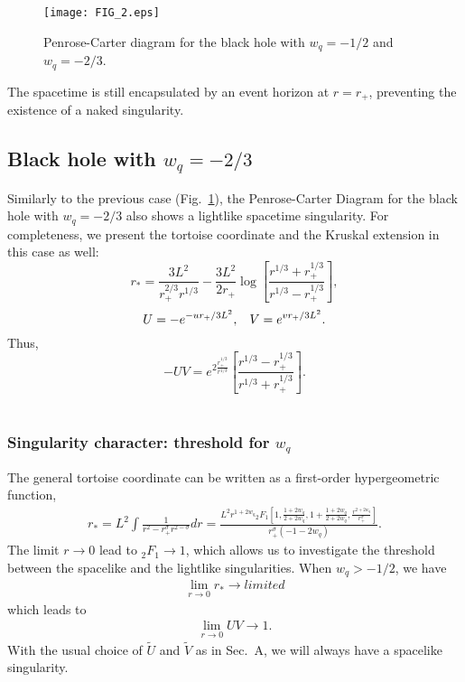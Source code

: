\documentclass[preprint]{revtex4-1}
\def\be{\begin{eqnarray}}
\def\ee{\end{eqnarray}}
\begin{document}
\begin{figure}[htp!]
\begin{center}
\texttt{[image: FIG\_2.eps]}
\end{center}
\caption{Penrose-Carter diagram for the black hole with $w_{q}=-1/2$ and $w_{q}=-2/3$.} \label{penrose_light}
\end{figure}

The spacetime is still encapsulated by an event horizon at $r=r_+$, preventing the existence of a naked singularity.

\subsection{Black hole with $w_{q}=-2/3$}

Similarly to the previous case (Fig.~\ref{penrose_light}), the Penrose-Carter Diagram for the black hole with $w_{q}=-2/3$ also shows a lightlike spacetime singularity. For completeness, we present the tortoise coordinate and the Kruskal extension in this case as well:
\begin{equation}\label{tortoise_3}
r_{*}= \frac{3L^2}{r_{+}^{2/3}r^{1/3}}-\frac{3L^2}{2r_{+}}\log{\left[\frac{r^{1/3}+r_{+}^{1/3}}{r^{1/3}-r_{+}^{1/3}}\right]},
\end{equation}
\[
U=-e^{-ur_{+}/3L^{2}}, \hspace{0.3cm} V=e^{vr_{+}/3L^{2}}.
\]
Thus, 
\[
-UV=e^{2\frac{ r_{+}^{1/3}}{{r^{1/3}}}}\left[\frac{r^{1/3}-r_{+}^{1/3}}{r^{1/3}+r_{+}^{1/3}}\right].
\]
\\

\subsubsection{Singularity character: threshold for $w_{q}$}

The general tortoise coordinate can be written as a first-order hypergeometric function,
\be
\label{gentort}
r_*= L^2 \int \frac{1}{r^2 - r_+^\sigma r^{2-\sigma}}dr = \frac{ L^2 r^{1 + 2w_q} { _2}F_1 \left[ 1 , \frac{1+2w_q}{2+2w_q} , 1 + \frac{1+2w_q}{2+2w_q}, \frac{r^{2+2w_q}}{r_+^\sigma}\right]}{r_+^\sigma (-1-2w_q)}.
\ee
The limit $r \rightarrow 0$ lead to ${ _2}F_1 \rightarrow 1$, which allows us to investigate the threshold between the spacelike and the lightlike singularities. 
When $w_q > -1/2$, we have
\be
\label{gt2}
\lim_{r\rightarrow 0} r_* \rightarrow limited
\ee
which leads to
\be
\label{gt2}
\lim_{r\rightarrow 0} UV \rightarrow 1.
\ee
With the usual choice of $\tilde{U}$ and $\tilde{V}$ as in Sec.~A, we will always have a spacelike singularity. 
\end{document}
